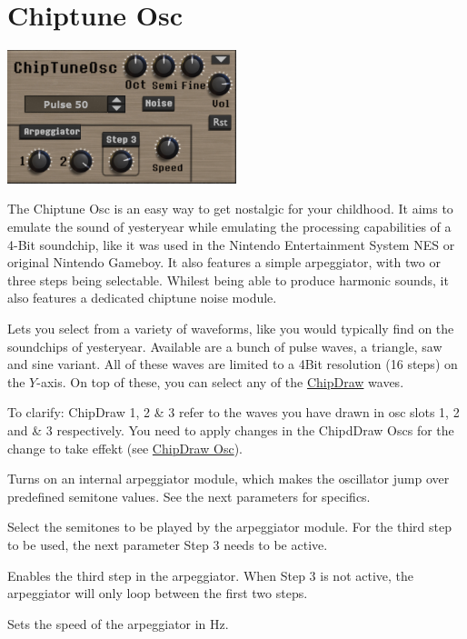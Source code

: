 \section{Chiptune Osc}
\begin{center}
    \includegraphics[width=0.5\textwidth]{graphics/chiptune_osc.png}
\end{center}
The Chiptune Osc is an easy way to get nostalgic for your childhood. It aims to emulate the sound of yesteryear while emulating the processing capabilities of a 4-Bit soundchip, like it was used in the Nintendo Entertainment System NES or original Nintendo Gameboy. It also features a simple arpeggiator, with two or three steps being selectable. Whilest being able to produce harmonic sounds, it also features a dedicated chiptune noise module.

{Lets you select from a variety of waveforms, like you would typically find on the soundchips of yesteryear. Available are a bunch of pulse waves, a triangle, saw and sine variant. All of these waves are limited to a 4Bit resolution (16 steps) on the $Y$-axis. On top of these, you can select any of the \hyperref[chipdraw]{ChipDraw} waves.

To clarify: ChipDraw 1, 2 \& 3 refer to the waves you have drawn in osc slots 1, 2 and \& 3 respectively. You need to apply changes in the ChipdDraw Oscs for the change to take effekt (see \hyperref[chipdraw]{ChipDraw Osc}).}

{Turns on an internal arpeggiator module, which makes the oscillator jump over predefined semitone values. See the next parameters for specifics.}

{Select the semitones to be played by the arpeggiator module. For the third step to be used, the next parameter Step 3 needs to be active.}

{Enables the third step in the arpeggiator. When Step 3 is not active, the arpeggiator will only loop between the first two steps.}

{Sets the speed of the arpeggiator in Hz.}

